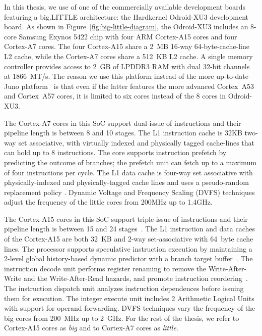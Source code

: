 In this thesis, we use of one of the commercially available development boards featuring a big.LITTLE architecture: the Hardkernel Odroid-XU3 development board. As shown in Figure~\ref{fig:big-little-diagram}, the Odroid-XU3 includes an 8-core Samsung Exynos 5422 chip with four ARM Cortex-A15 cores and four Cortex-A7 cores. The four Cortex-A15 share a 2~MB 16-way 64-byte-cache-line L2 cache, while the Cortex-A7 cores share a 512~KB L2 cache. A single memory controller provides access to 2~GB of LPDDR3 RAM with dual 32-bit channels at 1866~MT/s. The reason we use this platform instead of the more up-to-date Juno platform~\cite{Juno} is that even if the latter features the more advanced Cortex~A53 and Cortex~A57 cores, it is limited to six cores instead of the 8 cores in Odroid-XU3.



The Cortex-A7 cores in this SoC support dual-issue of instructions and their pipeline length is between 8 and 10 stages. The L1 instruction cache is 32KB two-way set associative, with virtually indexed and physically tagged cache-lines that can hold up to 8 instructions. The core supports instruction prefetch by predicting the outcome of branches; the prefetch unit can fetch up to a maximum of four instructions per cycle. The L1 data cache is four-way set associative with physically-indexed and physically-tagged cache lines and uses a pseudo-random replacement policy \cite{TRM_A7}. Dynamic Voltage and Frequency Scaling (DVFS) techniques adjust the frequency of the little cores from 200MHz up to 1.4GHz.

The Cortex-A15 cores in this SoC support triple-issue of instructions and their pipeline length is 
between 15 and 24 stages~\cite{MPR_A15}. The L1 instruction and data caches of the Cortex-A15 are 
both 32~KB and 2-way set-associative with 64~byte cache lines. The processor supports speculative 
instruction execution by maintaining a 2-level global history-based dynamic predictor 
with a branch target buffer~\cite{TRM_A15}. The instruction decode unit performs register renaming 
to remove the Write-After-Write and the Write-After-Read hazards, and promote 
instruction reordering~\cite{TRM_A15}. The instruction dispatch unit analyzes instruction dependences 
before issuing them for execution.  The integer execute unit includes 2 
Arithmetic Logical Units with support for operand forwarding. DVFS techniques vary the 
frequency of the big cores from 200~MHz up to 2~GHz.
For the rest of the thesis, we refer to Cortex-A15 cores as \textit{big} and to Cortex-A7 cores as \textit{little}.

